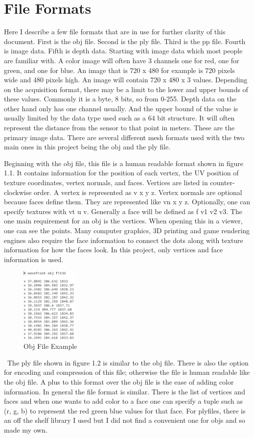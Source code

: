 \section{File Formats}
Here I describe a few file formats that are in use for further clarity of this document. First is the obj file. Second is the ply file. Third is the pp file. Fourth is image data. Fifth is depth data. Starting with image data which most people are familiar with. A color image will often have 3 channels one for red, one for green, and one for blue. An image that is 720 x 480 for example is 720 pixels wide and 480 pixels high. An image will contain 720 x 480 x 3 values. Depending on the acquisition format, there may be a limit to the lower and upper bounds of these values. Commonly it is a byte, 8 bits, so from 0-255. Depth data on the other hand only has one channel usually. And the upper bound of the value is usually limited by the data type used such as a 64 bit structure. It will often represent the distance from the sensor to that point in meters. These are the primary image data. There are several different mesh formats used with the two main ones in this project being the obj and the ply file.


Beginning with the obj file, this file is a human readable format shown in figure 1.1. It contains information for the position of each vertex, the UV position of texture coordinates, vertex normals, and faces. Vertices are listed in counter-clockwise order. A vertex is represented as v x y z. Vertex normals are optional because faces define them. They are represented like vn x y z. Optionally, one can specify textures with vt u v. Generally a face will be defined as f v1 v2 v3. The one main requirement for an obj is the vertices. When opening this in a viewer, one can see the points. Many computer graphics, 3D printing and game rendering engines also require the face information to connect the dots along with texture information for how the faces look. In this project, only vertices and face information is used.
\begin{figure}[!htb]
	\caption{Obj File Example}
	\centering
	\includegraphics[width=0.25\textwidth]{images/obj_file.png}
\end{figure}
\
The ply file shown in figure 1.2 is similar to the obj file. There is also the option for encoding and compression of this file; otherwise the file is human readable like the obj file. A plus to this format over the obj file is the ease of adding color information. In general the file format is similar. There is the list of vertices and faces and when one wants to add color to a face one can specify a tuple such as (r, g, b) to represent the red green blue values for that face. For plyfiles, there is an off the shelf library I used but I did not find a convenient one for objs and so made my own. 


